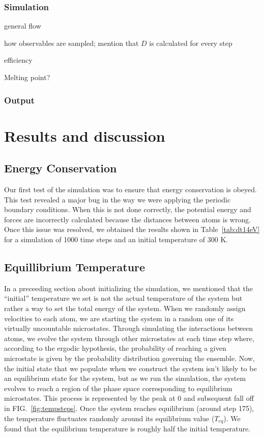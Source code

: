 \documentclass[10pt,showpacs,preprintnumbers,footinbib,amsmath,amssymb,aps,prl,twocolumn,groupedaddress,superscriptaddress,showkeys]{revtex4-1}
\begin{document}
\subsubsection*{Simulation}

general flow

how observables are sampled; mention that $D$ is calculated for every
step

efficiency



Melting point?



\subsubsection*{Output}



\section*{Results and discussion}

\subsection*{Energy Conservation}

Our first test of the simulation was to ensure that energy conservation
is obeyed. This test revealed a major bug in the way we were applying
the periodic boundary conditions. When this is not done correctly, the
potential energy and forces are incorrectly calculated because the
distances between atoms is wrong. Once this issue was resolved, we
obtained the results shown in Table~\ref{tab:dt14eV} for a simulation
of 1000 time steps and an initial temperature of 300 K.



\subsection*{Equillibrium Temperature}

In a preceeding section about initializing the simulation, we mentioned
that the ``initial'' temperature we set is not the actual temperature of the
system but rather a way to set the total energy of the system.
When we randomly assign velocities to each atom,
we are starting the system in a random one of its virtually uncountable
microstates. Through simulating the interactions between atoms, we
evolve the system through other microstates at each time step where,
according to the ergodic hypothesis, the probability of reaching a
given microstate is given by the probability distribution governing
the ensemble. Now, the initial state that we populate when we construct
the system isn't likely to be an equilibrium state for the system, but as we
run the simulation, the system evolves to reach a region of the phase
space corresponding to equilibrium microstates. This process is represented
by the peak at 0 and subsequent fall off in FIG.~\ref{fig:tempsteps}.
Once the system reaches equilibrium (around step 175), the temperature
fluctuates randomly around its equilibrium value ($T_{eq}$). We found
that the equilibrium temperature is roughly half the initial temperature.
\end{document}
